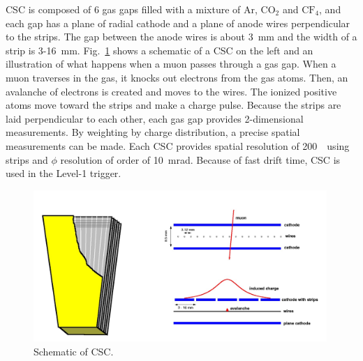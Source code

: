 CSC is composed of 6 gas gaps filled with a mixture of Ar, $\textrm{CO}_2$ and $\textrm{CF}_4$,
and each gap has a plane of radial cathode and a plane of anode wires perpendicular 
to the strips. The gap between the anode wires is about 3~mm and the width of a strip 
is 3-16~mm. Fig.~\ref{fig:muon_dt} shows a schematic of a CSC on the left 
and an illustration of what happens when a muon passes through a gas gap. 
When a muon traverses in the gas, it knocks out electrons from the gas atoms. 
Then, an avalanche of electrons is created and moves to the wires.
The ionized positive atoms move toward the strips and make a charge pulse. 
Because the strips are laid perpendicular to each other, 
each gas gap provides 2-dimensional measurements. 
By weighting by charge distribution, a precise spatial measurements can be made. 
Each CSC provides spatial resolution of 200~\um\ using strips 
and $\phi$ resolution of order of 10~mrad.
Because of fast drift time, CSC is used in the Level-1 trigger. 
%
\begin{figure}[h] 
\centering
\vspace{1cm}
\includegraphics[width=0.99\textwidth]{figures/csc.jpg}
\caption{Schematic of CSC.}
\label{fig:muon_dt} 
\end{figure} 

